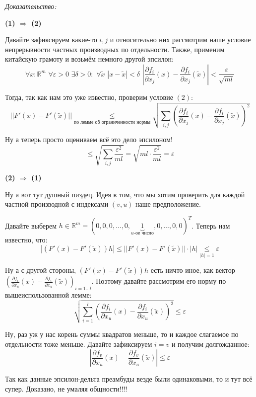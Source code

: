 \documentclass{article}
\def\dbl{\,\,}
\begin{document}
\textit{Доказательство:}

\textbf{(1) $\Rightarrow$ (2)}

Давайте зафиксируем какие-то $i, j$ и относительно них рассмотрим наше условие непрерывности частных производных по отдельности. Также, применим китайскую грамоту и возьмём немного другой эпсилон:
\[\forall x: \mathbb{R}^m \dbl \forall \varepsilon > 0 \dbl \exists \delta > 0: \dbl \forall \widetilde{x} \dbl |x - \widetilde{x}| < \delta \dbl \left|\frac{\partial f_i}{\partial x_j}(x) - \frac{\partial f_i}{\partial x_j}(\widetilde{x})\right| < \frac{\varepsilon}{\sqrt{ml}}\]

Тогда, так как нам это уже известно, проверим условие $(2)$:
\[||F'(x) - F'(\widetilde{x})|| \underset{\text{по лемме об ограниченности нормы}}{\le} \sqrt{\sum_{i, j}{\left(\frac{\partial f_i}{\partial x_j}(x) - \frac{\partial f_i}{\partial x_j}(\widetilde{x})\right)^2}}\]

Ну а теперь просто оцениваем всё это дело эпсилоном!
\[\le \sqrt{\sum_{i, j}{\frac{\varepsilon^2}{ml}}}=\sqrt{ml\cdot\frac{\varepsilon^2}{ml}} = \varepsilon\]

\textbf{(2) $\Rightarrow$ (1)}

Ну а вот тут душный пиздец. Идея в том, что мы хотим проверить для каждой частной производной с индексами $(v, u)$ наше предположение.

Давайте выберем $h \in \mathbb{R}^m = (0,0,0, \ldots, 0, \underbrace{1}_{u\text{-ое число}}, 0, \ldots, 0, 0)^T$.
Теперь нам известно, что:
\[|(F'(x) - F'(\widetilde{x}))h| \le ||F'(x) - F'(\widetilde{x})|| \cdot |h| \underset{|h| = 1}{\le} \varepsilon\]

Ну а с другой стороны, $(F'(x) - F'(\widetilde{x}))h$ есть ничто иное, как вектор $\left(\frac{\partial f_i}{\partial x_u}(x) - \frac{\partial f_i}{\partial x_u}(\widetilde{x})\right)_{i = 1 \ldots l}$. Поэтому давайте рассмотрим его норму по вышеиспользованной лемме:
\[\sqrt{\sum_{i = 1}^l{\left(\frac{\partial f_i}{\partial x_u}(x) - \frac{\partial f_i}{\partial x_u}(\widetilde{x})\right)^2}} \le \varepsilon\]

Ну, раз уж у нас корень суммы квадратов меньше, то и каждое слагаемое по отдельности тоже меньше. Давайте зафиксируем $i = v$ и получим долгожданное:
\[\left|\frac{\partial f_v}{\partial x_u}(x) - \frac{\partial f_v}{\partial x_u}(\widetilde{x})\right| \le \varepsilon\]

Так как данные эпсилон-дельта преамбуды везде были одинаковыми, то и тут всё супер. Доказано, не умаляя общности!!!!
\end{document}
